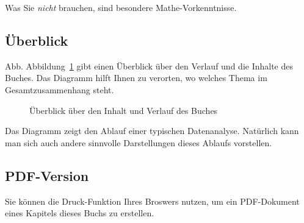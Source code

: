 \documentclass[
  a4paper,
  DIV=11]{scrreprt}
\theoremstyle{definition}
\theoremstyle{definition}
\theoremstyle{definition}
\theoremstyle{remark}
\begin{document}
Was Sie \emph{nicht} brauchen, sind besondere Mathe-Vorkenntnisse.

\subsection{Überblick}\label{uxfcberblick}

Abb. Abbildung~\ref{fig-ueberblick} gibt einen Überblick über den
Verlauf und die Inhalte des Buches. Das Diagramm hilft Ihnen zu
verorten, wo welches Thema im Gesamtzusammenhang steht.

\begin{figure}


\caption{\label{fig-ueberblick}Überblick über den Inhalt und Verlauf des
Buches}

\end{figure}%

Das Diagramm zeigt den Ablauf einer typischen Datenanalyse. Natürlich
kann man sich auch andere sinnvolle Darstellungen dieses Ablaufs
vorstellen.

\subsection{PDF-Version}\label{pdf-version}

Sie können die Druck-Funktion Ihres Broswers nutzen, um ein PDF-Dokument
eines Kapitels dieses Buchs zu erstellen.
\end{document}

